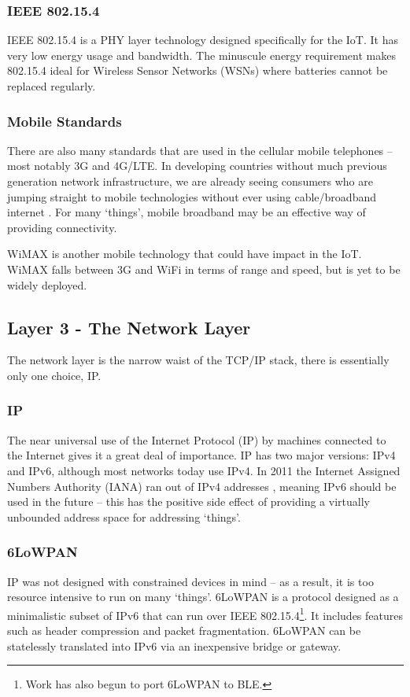 \documentclass[10pt,journal,compsoc]{IEEEtran}
\begin{document}
\subsubsection{IEEE 802.15.4}
IEEE 802.15.4 is a PHY layer technology designed specifically for the IoT. It
has very low energy usage and bandwidth. The minuscule energy requirement makes
802.15.4 ideal for Wireless Sensor Networks (WSNs) where batteries cannot be
replaced regularly. 

\subsubsection{Mobile Standards}
There are also many standards that are used in the cellular mobile telephones
-- most notably 3G and 4G/LTE. In developing countries without much previous
generation network infrastructure, we are already seeing consumers who are
jumping straight to mobile technologies without ever using cable/broadband
internet \cite{Kritzinger2013}. For many `things', mobile broadband may be an
effective way of providing connectivity.  

WiMAX is another mobile technology that could have impact in the IoT. WiMAX
falls between 3G and WiFi in terms of range and speed, but is yet to be widely
deployed.  

\subsection{Layer 3 - The Network Layer}
The network layer is the narrow waist of the TCP/IP stack, there is essentially
only one choice, IP. 

\subsubsection{IP}
The near universal use of the Internet Protocol (IP) by machines connected to
the Internet gives it a great deal of importance. IP has two major versions:
IPv4 and IPv6, although most networks today use IPv4. In 2011 the Internet
Assigned Numbers Authority (IANA) ran out of IPv4 addresses \cite{Potaroo},
meaning IPv6 should be used in the future -- this has the positive side effect
of providing a virtually unbounded address space for addressing `things'. 

\subsubsection{6LoWPAN}
IP was not designed with constrained devices in mind -- as a result, it is too
resource intensive to run on many `things'. 6LoWPAN is a protocol designed as a
minimalistic subset of IPv6 that can run over IEEE 802.15.4\footnote{Work has
also begun to port 6LoWPAN to BLE.}. It includes features such as header
compression and packet fragmentation. 6LoWPAN can be statelessly translated
into IPv6 via an inexpensive bridge or gateway. 
\end{document}
